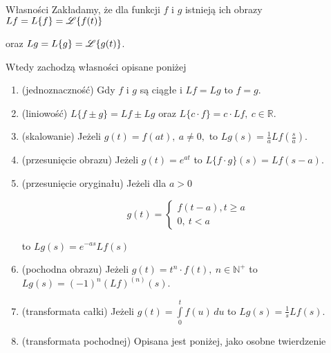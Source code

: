 \begin{tw}{Własności}
    Zakładamy, że dla funkcji $f$ i $g$ istnieją ich obrazy $Lf = L\{ f \} = \mathscr{L} \{ f(t) \} $ 

    oraz $ Lg = L\{ g \} = \mathscr{L} \{ g(t) \} $.

    Wtedy zachodzą własności opisane poniżej

    \begin{enumerate}
        \item (jednoznaczność) Gdy $f$ i $g$ są ciągłe i $Lf = Lg$ to $f = g$.
        \item (liniowość) $ L\{ f \pm g \} = Lf \pm Lg $ oraz $ L \{ c \cdot f \} = c \cdot Lf, \ c\in \mathbb{R} $.
        \item (skalowanie) Jeżeli $ g(t) = f(at), \ a \neq 0, $ to $ Lg(s) = \frac{1}{a} Lf \left( \frac{s}{a} \right) $.
        \item (przesunięcie obrazu) Jeżeli $ g(t) = e^{at} $ to $ L \{ f \cdot g \}(s) = Lf(s - a)$.
        \item (przesunięcie oryginału) Jeżeli dla $a > 0$
        
        \[ g(t) = \begin{cases}
            f(t - a), t \geq a \\ 0, \ t < a
        \end{cases} \]

        to $Lg(s) = e^{-as} Lf(s) $

        \item (pochodna obrazu) Jeżeli $g(t) = t^n \cdot f(t), \ n \in \mathbb{N}^+$ to $Lg(s) = (-1)^n (Lf)^{(n)}(s)$.
        \item (transformata całki) Jeżeli $ g(t) = \int\limits_{0}^{t} f(u) \, du $ to $ Lg(s) = \frac{1}{s} Lf(s) $.
        \item (transformata pochodnej) Opisana jest poniżej, jako osobne twierdzenie
    \end{enumerate}

\end{tw}
